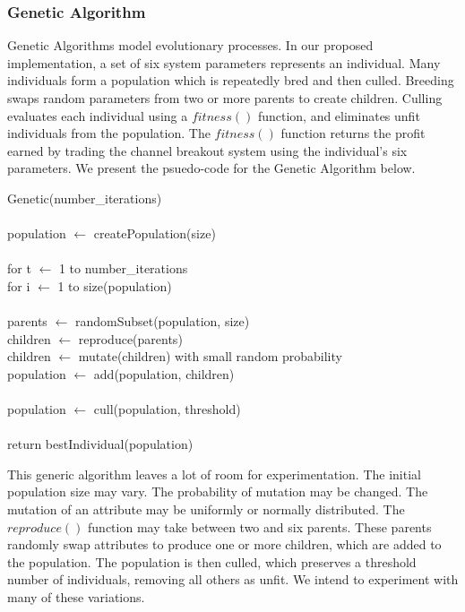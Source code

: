 \documentclass[12pt]{article}
\begin{document}
\subsubsection{Genetic Algorithm}

Genetic Algorithms model evolutionary processes.  In our proposed
implementation, a set of six system parameters represents an individual.  Many
individuals form a population which is repeatedly bred and then culled.
Breeding swaps random parameters from two or more parents to create children.
Culling evaluates each individual using a $fitness()$ function, and eliminates
unfit individuals from the population.  The $fitness()$ function returns the
profit earned by trading the channel breakout system using the individual's six
parameters.  We present the psuedo-code for the Genetic Algorithm below.

\vspace{10pt}
\setlength{\parindent}{5mm}
\indent Genetic(number\_iterations)\\\\
\indent\indent population $\leftarrow$ createPopulation(size)\\\\
\indent \indent for t $\leftarrow$ 1 to number\_iterations\\
\indent \indent \indent for i $\leftarrow$ 1 to size(population)\\\\
\indent \indent \indent \indent parents $\leftarrow$ randomSubset(population, size)\\
\indent \indent \indent \indent children $\leftarrow$ reproduce(parents)\\
\indent \indent \indent \indent children $\leftarrow$ mutate(children) with small random probability\\
\indent \indent \indent \indent population $\leftarrow$ add(population, children)\\\\
\indent \indent \indent population $\leftarrow$ cull(population, threshold)\\\\
\indent \indent return bestIndividual(population)\\
\setlength{\parindent}{0mm}

This generic algorithm leaves a lot of room for experimentation. The initial
population size may vary.  The probability of mutation may be changed.  The
mutation of an attribute may be uniformly or normally distributed.  The
$reproduce()$ function may take between two and six parents.  These parents
randomly swap attributes to produce one or more children, which are added to
the population.  The population is then culled, which preserves a threshold
number of individuals, removing all others as unfit. We intend to experiment
with many of these variations.
\end{document}

